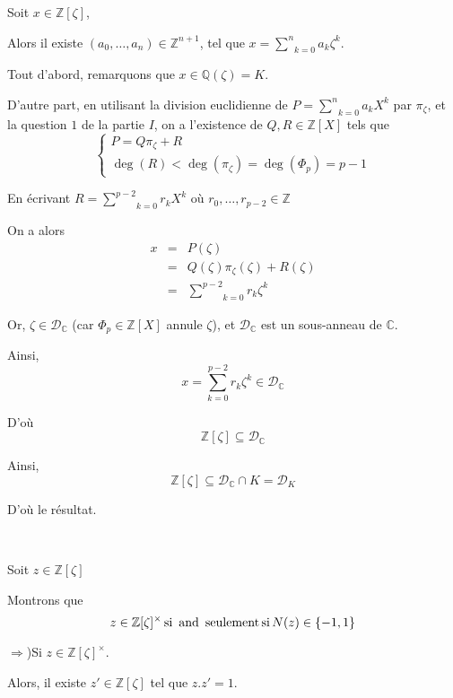 Soit $x \in \mathbb{Z} [\zeta]$,

Alors il existe $(a_0, \ldots, a_n) \in \mathbb{Z}^{n + 1}$, tel que $x =
\underset{k = 0}{\overset{n}{\sum}} a_k \zeta^k$.

Tout d'abord, remarquons que $x \in \mathbb{Q} (\zeta) = K$.

D'autre part, en utilisant la division euclidienne de $P = \underset{k =
0}{\overset{n}{\sum}} a_k X^k$ par $\pi_{\zeta}$, et la question $1$ de la
partie $I$, on a l'existence de $Q, R \in \mathbb{Z} [X]$ tels que
\[ \left\{\begin{array}{l}
     P = Q \pi_{\zeta} + R\\
     \deg (R) < \deg \left( {\pi_{\zeta}}  \right) = \deg (\Phi_p) = p - 1
   \end{array}\right. \]


En {\'e}crivant $R = \underset{k = 0}{\overset{p - 2}{\sum}} r_k X^k$ o{\`u}
$r_0, \ldots, r_{p - 2} \in \mathbb{Z}$

On a alors
\begin{eqnarray*}
  x & = & P (\zeta)\\
  & = & Q (\zeta) \pi_{\zeta} (\zeta) + R (\zeta)\\
  & = & \underset{k = 0}{\overset{p - 2}{\sum}} r_k \zeta^k
\end{eqnarray*}


Or, $\zeta \in \mathcal{D}_{\mathbb{C}}$ (car $\Phi_p \in \mathbb{Z} [X]$
annule $\zeta$), et $\mathcal{D}_{\mathbb{C}}$ est un sous-anneau de
$\mathbb{C}$.

Ainsi,
\[ x = \underset{k = 0}{\overset{p - 2}{\sum}} r_k \zeta^k \in
   \mathcal{D}_{\mathbb{C}} \]


D'o{\`u}
\[ \mathbb{Z} [\zeta] \subseteq \mathcal{D}_{\mathbb{C}} \]


Ainsi,
\[ \mathbb{Z} [\zeta] \subseteq \mathcal{D}_{\mathbb{C}} \cap K =\mathcal{D}_K
\]


D'o{\`u} le r{\'e}sultat.

\

 Soit $z \in \mathbb{Z} [\zeta]$

 Montrons que
\[ z \in \mathbb{Z} [\zeta]^{\times} \operatorname{si} \text{ and } \operatorname{seulement}
   \operatorname{si} N (z) \in \{ - 1, 1 \} \]


$\Rightarrow$)Si $z \in \mathbb{Z} [\zeta]^{\times}$.

Alors, il existe $z' \in \mathbb{Z} [\zeta]$ tel que $z.z' = 1$.

\

